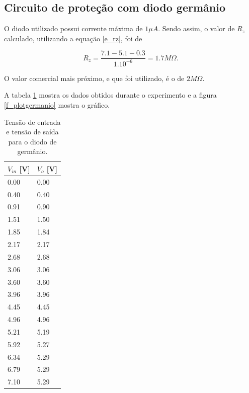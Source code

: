 \subsection{Circuito de proteção com diodo germânio}
O diodo utilizado possui corrente máxima de $1 \mu A$. Sendo assim, o valor de $R_z$ calculado, utilizando a equação \ref{e_rz}, foi de

\[ R_z = \frac{7.1 - 5.1 - 0.3}{1.10^{-6}} = 1.7 M \Omega.\]

O valor comercial mais próximo, e que foi utilizado, é o de $2 M \Omega$.

A tabela \ref{t_germânio} mostra os dados obtidos durante o experimento e a figura \ref{f_plotgermanio} mostra o gráfico.

\begin{small}
	\begin{table}[H]
		\begin{center}
			\caption{Tensão de entrada e tensão de saída para o diodo de germânio.}
			\begin{tabular}{l|l}
					\hline
					$V_{in}$ [V] & $V_o$ [V] \\
					\hline
					0.00 & 0.00 \\
					\hline
					0.40 & 0.40 \\
					\hline
					0.91 & 0.90 \\
					\hline
					1.51 & 1.50 \\
					\hline
					1.85 & 1.84 \\
					\hline
					2.17 & 2.17 \\
					\hline
					2.68 & 2.68 \\
					\hline
					3.06 & 3.06 \\
					\hline
					3.60 & 3.60 \\
					\hline
					3.96 & 3.96 \\
					\hline
					4.45 & 4.45 \\
					\hline
					4.96 & 4.96 \\
					\hline
					5.21 & 5.19 \\
					\hline
					5.92 & 5.27 \\
					\hline
					6.34 & 5.29 \\
					\hline
					6.79 & 5.29 \\
					\hline
					7.10 & 5.29 \\
					\hline
			\end{tabular}
			\label{t_germânio}
		\end{center}
	\end{table}
\end{small}

